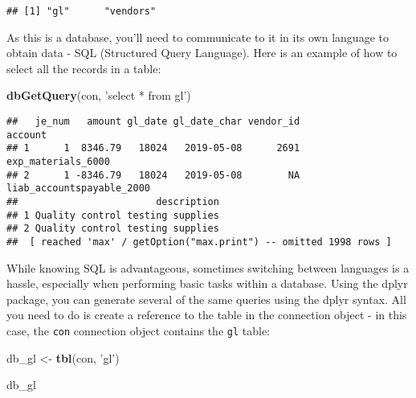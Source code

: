 \documentclass[
]{book}
\newenvironment{Shaded}{\begin{snugshade}}{\end{snugshade}}
\newcommand{\KeywordTok}[1]{\textcolor[rgb]{0.13,0.29,0.53}{\textbf{#1}}}
\newcommand{\NormalTok}[1]{#1}
\newcommand{\StringTok}[1]{\textcolor[rgb]{0.31,0.60,0.02}{#1}}
\begin{document}
\begin{verbatim}
## [1] "gl"      "vendors"
\end{verbatim}

As this is a database, you'll need to communicate to it in its own language to obtain data - SQL (Structured Query Language). Here is an example of how to select all the records in a table:

\begin{Shaded}
\begin{Highlighting}[]
\KeywordTok{dbGetQuery}\NormalTok{(con, }\StringTok{'select * from gl'}\NormalTok{)}
\end{Highlighting}
\end{Shaded}

\begin{verbatim}
##   je_num   amount gl_date gl_date_char vendor_id                   account
## 1      1  8346.79   18024   2019-05-08      2691        exp_materials_6000
## 2      1 -8346.79   18024   2019-05-08        NA liab_accountspayable_2000
##                        description
## 1 Quality control testing supplies
## 2 Quality control testing supplies
##  [ reached 'max' / getOption("max.print") -- omitted 1998 rows ]
\end{verbatim}

While knowing SQL is advantageous, sometimes switching between languages is a hassle, especially when performing basic tasks within a database. Using the dplyr package, you can generate several of the same queries using the dplyr syntax. All you need to do is create a reference to the table in the connection object - in this case, the \texttt{con} connection object contains the \texttt{gl} table:

\begin{Shaded}
\begin{Highlighting}[]
\NormalTok{db_gl <-}\StringTok{ }\KeywordTok{tbl}\NormalTok{(con, }\StringTok{'gl'}\NormalTok{)}

\NormalTok{db_gl}
\end{Highlighting}
\end{Shaded}
\end{document}
